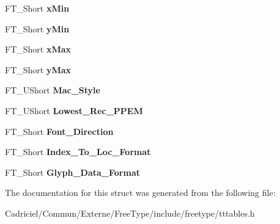 \begin{DoxyCompactItemize}
\item 
\hypertarget{struct_t_t___header___ae4553d76427d9f7a28595ed71897dcbb}{F\-T\-\_\-\-Short {\bfseries x\-Min}}\label{struct_t_t___header___ae4553d76427d9f7a28595ed71897dcbb}

\item 
\hypertarget{struct_t_t___header___ac6aad4966bac8a96c5bc48765b3d694a}{F\-T\-\_\-\-Short {\bfseries y\-Min}}\label{struct_t_t___header___ac6aad4966bac8a96c5bc48765b3d694a}

\item 
\hypertarget{struct_t_t___header___a593b9cc3e11532972a7fc96944dd1ae9}{F\-T\-\_\-\-Short {\bfseries x\-Max}}\label{struct_t_t___header___a593b9cc3e11532972a7fc96944dd1ae9}

\item 
\hypertarget{struct_t_t___header___a02d236cd8150c00e886a0c487c04dffa}{F\-T\-\_\-\-Short {\bfseries y\-Max}}\label{struct_t_t___header___a02d236cd8150c00e886a0c487c04dffa}

\item 
\hypertarget{struct_t_t___header___a82f2a5a836b802e44ff712b3afc8745c}{F\-T\-\_\-\-U\-Short {\bfseries Mac\-\_\-\-Style}}\label{struct_t_t___header___a82f2a5a836b802e44ff712b3afc8745c}

\item 
\hypertarget{struct_t_t___header___a1d20801c3482dee2529d294441ed9af3}{F\-T\-\_\-\-U\-Short {\bfseries Lowest\-\_\-\-Rec\-\_\-\-P\-P\-E\-M}}\label{struct_t_t___header___a1d20801c3482dee2529d294441ed9af3}

\item 
\hypertarget{struct_t_t___header___a1cb7d8a2a76ae1acda3ac94bcd555954}{F\-T\-\_\-\-Short {\bfseries Font\-\_\-\-Direction}}\label{struct_t_t___header___a1cb7d8a2a76ae1acda3ac94bcd555954}

\item 
\hypertarget{struct_t_t___header___a05a488607bfae319de096b4bd9cf8c6d}{F\-T\-\_\-\-Short {\bfseries Index\-\_\-\-To\-\_\-\-Loc\-\_\-\-Format}}\label{struct_t_t___header___a05a488607bfae319de096b4bd9cf8c6d}

\item 
\hypertarget{struct_t_t___header___adeeedce4bb708c3e068ed80366ec921d}{F\-T\-\_\-\-Short {\bfseries Glyph\-\_\-\-Data\-\_\-\-Format}}\label{struct_t_t___header___adeeedce4bb708c3e068ed80366ec921d}

\end{DoxyCompactItemize}


The documentation for this struct was generated from the following file\-:\begin{DoxyCompactItemize}
\item 
Cadriciel/\-Commun/\-Externe/\-Free\-Type/include/freetype/tttables.\-h\end{DoxyCompactItemize}
